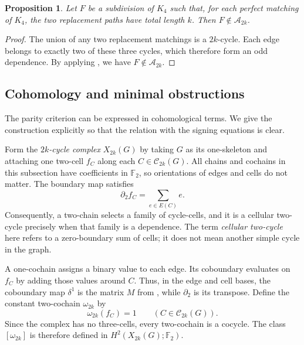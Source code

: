 \documentclass{article}
\newcommand{\FF}{\mathbb{F}}
\newtheorem{proposition}[theorem]{Proposition}
\theoremstyle{definition}
\theoremstyle{remark}
\begin{document}
\begin{proposition}\label{prop:K4-subdivision-obstruction}
Let $F$ be a subdivision of $K_4$ such that, for each perfect matching
of $K_4$, the two replacement paths have total length $k$.  Then
$F\notin\mathcal A_{2k}$.
\end{proposition}
\begin{proof}
The union of any two replacement matchings is a $2k$-cycle.  Each edge
belongs to exactly two of these three cycles, which therefore form an odd
dependence.  By applying , we have $F\notin\mathcal A_{2k}$.
\end{proof}

\subsection{Cohomology and minimal obstructions}

The parity criterion can be expressed in cohomological terms.  We give
the construction explicitly so that the relation with the signing
equations is clear.

Form the \emph{$2k$-cycle complex} $X_{2k}(G)$ by taking $G$ as its
one-skeleton and attaching one two-cell $f_C$ along each
$C\in\mathcal C_{2k}(G)$.  All chains and cochains in this subsection
have coefficients in $\FF_2$, so orientations of edges and cells do not
matter.  The boundary map satisfies
\[
\partial_2 f_C=\sum_{e\in E(C)}e.
\]
Consequently, a two-chain selects a family of cycle-cells, and it is a
cellular two-cycle precisely when that family is a dependence.  The term
\emph{cellular two-cycle} here refers to a zero-boundary sum of cells;
it does not mean another simple cycle in the graph.

A one-cochain assigns a binary value to each edge.  Its coboundary
evaluates on $f_C$ by adding those values around $C$.  Thus, in the edge
and cell bases, the coboundary map $\delta^1$ is the matrix $M$ from
, while $\partial_2$ is its transpose.  Define
the constant two-cochain $\omega_{2k}$ by
\[
\omega_{2k}(f_C)=1\qquad(C\in\mathcal C_{2k}(G)).
\]
Since the complex has no three-cells, every two-cochain is a cocycle.
The class $[\omega_{2k}]$ is therefore defined in
$H^2(X_{2k}(G);\FF_2)$.
\end{document}
